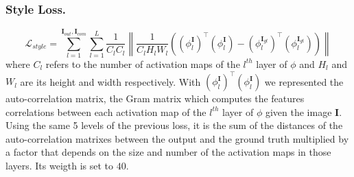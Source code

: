 \documentclass[10pt,twocolumn,letterpaper]{article}
\newcommand\norm[1]{\left\lVert#1\right\rVert}
\begin{document}
\subsubsection{Style Loss.}
\begin{dmath}
        \mathcal{L}_{style} = \sum^{\mathbf{I}_{out},\mathbf{I}_{com}}_{l=1}
        \sum^L_{l=1} \frac{1}{C_l C_l} \norm{ \frac{1}{C_l H_l W_l}
        ((\phi^{\mathbf{I}}_l)^\top(\phi^{\mathbf{I}}_l) -
        (\phi^{\mathbf{I}_{gt}}_l)^\top(\phi^{\mathbf{I}_{gt}}_l)  )}
\end{dmath}
where \(C_l\) refers to the number of activation maps of the \(l^{th}\) layer of
\(\phi\) and \(H_l\) and \(W_l\) are its height and width respectively. With
\((\phi^{\mathbf{I}}_l)^\top(\phi^{\mathbf{I}}_l)\) we represented the
auto-correlation matrix, the Gram matrix\cite{gatys1508neural} which computes
the features correlations between each activation map of the \(l^{th}\) layer of
\(\phi\) given the image \(\mathbf{I}\).\\
Using the same 5 levels of the previous loss, it is the sum of the distances of
the auto-correlation matrixes between the output and the ground truth multiplied
by a factor that depends on the size and number of the activation maps in those
layers. Its weigth is set to \(40\).
\end{document}
